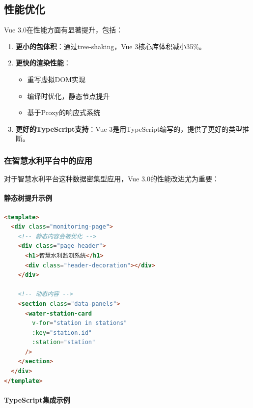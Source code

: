 \subsection{性能优化}\label{ux6027ux80fdux4f18ux5316}

Vue 3.0在性能方面有显著提升，包括：

\begin{enumerate}
\def\labelenumi{\arabic{enumi}.}
\item
  \textbf{更小的包体积}：通过tree-shaking，Vue 3核心库体积减小35\%。
\item
  \textbf{更快的渲染性能}：

  \begin{itemize}
  \tightlist
  \item
    重写虚拟DOM实现
  \item
    编译时优化，静态节点提升
  \item
    基于Proxy的响应式系统
  \end{itemize}
\item
  \textbf{更好的TypeScript支持}：Vue
  3是用TypeScript编写的，提供了更好的类型推断。
\end{enumerate}

\subsubsection{在智慧水利平台中的应用}\label{ux5728ux667aux6167ux6c34ux5229ux5e73ux53f0ux4e2dux7684ux5e94ux7528-1}

对于智慧水利平台这种数据密集型应用，Vue 3.0的性能改进尤为重要：

\paragraph{静态树提升示例}\label{ux9759ux6001ux6811ux63d0ux5347ux793aux4f8b}

\begin{lstlisting}[language=HTML]
<template>
  <div class="monitoring-page">
    <!-- 静态内容会被优化 -->
    <div class="page-header">
      <h1>智慧水利监测系统</h1>
      <div class="header-decoration"></div>
    </div>
    
    <!-- 动态内容 -->
    <section class="data-panels">
      <water-station-card 
        v-for="station in stations" 
        :key="station.id"
        :station="station"
      />
    </section>
  </div>
</template>
\end{lstlisting}

\paragraph{TypeScript集成示例}\label{typescriptux96c6ux6210ux793aux4f8b}

